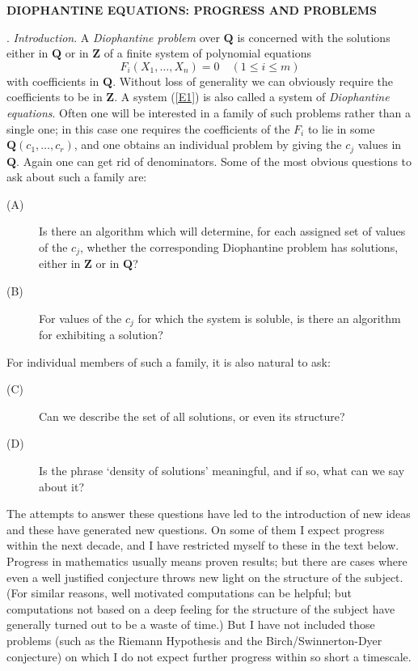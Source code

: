 \documentclass[12pt]{article}
\def\bQ{{\mathbf Q}}
\def\bZ{{\mathbf Z}}
\def\beq{\begin{equation} \label}
\begin{document}
\begin{center}
\textbf{DIOPHANTINE EQUATIONS: PROGRESS AND PROBLEMS}
\end{center}


\vskip 0.1in


. \emph{Introduction}. \newline
A \emph{Diophantine problem} over $\bQ$ is concerned with the solutions
either in $\bQ$ or in $\bZ$ of a finite system of polynomial equations
\beq{E1} F_i(X_1,\ldots,X_n)=0 \quad (1\leq i\leq m) \end{equation}
with coefficients in $\bQ$. Without loss of generality we can obviously
require the coefficients to be in $\bZ$. A system (\ref{E1}) is also called
a system of \emph{Diophantine equations}. Often one will be interested in a
family of such problems rather than a single one; in this case one requires
the coefficients of the $F_i$ to lie in some $\bQ(c_1,\ldots,c_r)$, and one
obtains an individual problem by giving the $c_j$ values in $\bQ$. Again one
can get rid of denominators.
Some of the most obvious questions to ask about such a family are:
\begin{description}
\item[(A)] Is there an algorithm which will determine, for each assigned set
of values of the $c_j$, whether the corresponding Diophantine problem has
solutions, either in $\bZ$ or in $\bQ$?
\item[(B)] For values of the $c_j$ for which the system is soluble, is there
an algorithm for exhibiting a solution?
\end{description}
For individual members of such a family, it is also natural to ask:
\begin{description}
\item[(C)] Can we describe the set of all solutions, or even its structure?
\item[(D)] Is the phrase `density of solutions' meaningful, and if so, what
can we say about it?
\end{description}
The attempts to answer these questions have led to the introduction of new
ideas and these have generated new questions. On some of them I expect progress
within the next decade, and I have restricted myself
to these in the text below. Progress
in mathematics usually means proven results; but there are cases where even a 
well justified conjecture throws new light on the structure of the
subject. (For similar reasons, well motivated computations can be helpful; but
computations not based on a deep feeling for the structure of the subject have
generally turned out to be a waste of time.)
But I have not included those problems (such as the Riemann Hypothesis and the
Birch/Swinnerton-Dyer conjecture) on which I do not expect further progress
within so short a timescale.
\end{document}
